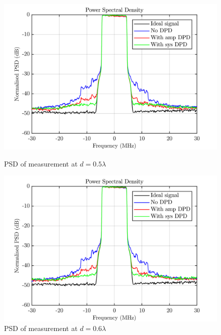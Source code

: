 \begin{figure}[H]
  \centering
  \begin{minipage}[b]{0.5\textwidth}
	\includegraphics[scale = 0.5]{figures/measurement/cree/meas3/psd_0p5.png}
	\caption{PSD of measurement at $d = 0.5\lambda$ }	
    \label{fig:meas4_psd3_2}
  \end{minipage}
  \hfill
  \begin{minipage}[b]{0.4\textwidth}
	\includegraphics[scale = 0.5]{figures/measurement/cree/meas3/psd_0p6.png}
	\caption{PSD of measurement at $d = 0.6\lambda$}
    \label{fig:meas4_psd4_2}
  \end{minipage}
\end{figure}


